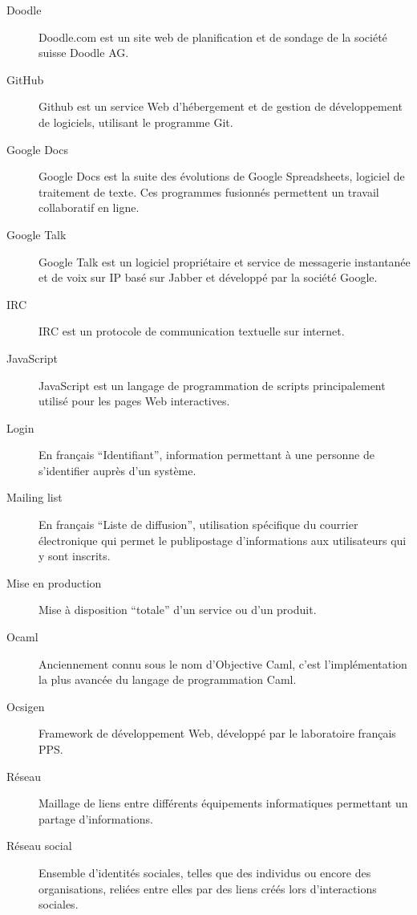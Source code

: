 \documentclass{life-fr}
\begin{document}
\begin{description}
\item[Doodle]
Doodle.com est un site web de planification et de sondage de la société suisse Doodle AG.

\item[GitHub]
Github est un service Web d'hébergement et de gestion de développement de logiciels, utilisant le programme Git. 

\item[Google Docs]
Google Docs est la suite des évolutions de Google Spreadsheets, logiciel de traitement de texte. Ces programmes fusionnés permettent un travail collaboratif en ligne.

\item[Google Talk]
Google Talk est un logiciel propriétaire et service de messagerie instantanée et de voix sur IP basé sur Jabber et développé par la société Google.

\item[IRC]
IRC est un protocole de communication textuelle sur internet.

\item[JavaScript]
JavaScript est un langage de programmation de scripts principalement utilisé pour les pages Web interactives.

\item[Login]
En français ``Identifiant'', information permettant à une personne de s'identifier auprès d'un système.

\item[Mailing list]
En français ``Liste de diffusion'', utilisation spécifique du courrier électronique qui permet le publipostage d'informations aux utilisateurs qui y sont inscrits.

\item[Mise en production]
Mise à disposition ``totale'' d’un service ou d’un produit.

\item[Ocaml]
Anciennement connu sous le nom d'Objective Caml, c’est l'implémentation la plus avancée du langage de programmation Caml.

\item[Ocsigen]
Framework de développement Web, développé par le laboratoire français PPS.

\item[Réseau]
Maillage de liens entre différents équipements informatiques permettant un partage d’informations.

\item[Réseau social]
Ensemble d'identités sociales, telles que des individus ou encore des organisations, reliées entre elles par des liens créés lors d’interactions sociales.


\end{description}
\end{document}
